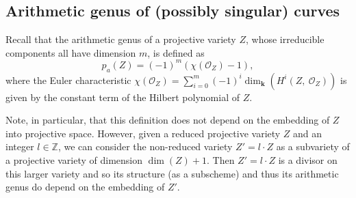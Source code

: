 \documentclass[english,11pt,reqno]{amsart}
\newcommand{\kk}{\mathbf{k}}
\newcommand{\Z}{\mathbb{Z}}
\begin{document}
	\subsection{Arithmetic genus of (possibly singular) curves} \label{subsection:arithmetic_genus}
	Recall that the arithmetic genus of a projective variety $Z$, whose irreducible components all have dimension $m$, is defined as $$p_a(Z)=(-1)^m(\chi(\mathcal{O}_Z)-1),$$
	where the Euler characteristic $\chi(\mathcal{O}_Z)= \sum_{i= 0}^m (-1)^i \dim_{\kk}(H^i(Z,\:\mathcal{O}_Z))$ is given by the constant term of the Hilbert polynomial of $Z$. \par 
	Note, in particular, that this definition does not depend on the embedding of $Z$ into projective space. However, given a reduced projective variety $Z$ and an integer $l\in \Z$, we can consider the non-reduced variety $Z'=l\cdot Z$ as a subvariety of a projective variety of dimension $\dim(Z)+1$. Then $Z'=l \cdot Z$ is a divisor on this larger variety and so its structure (as a subscheme) and thus its arithmetic genus do depend on the embedding of $Z'$.
	
\end{document}
